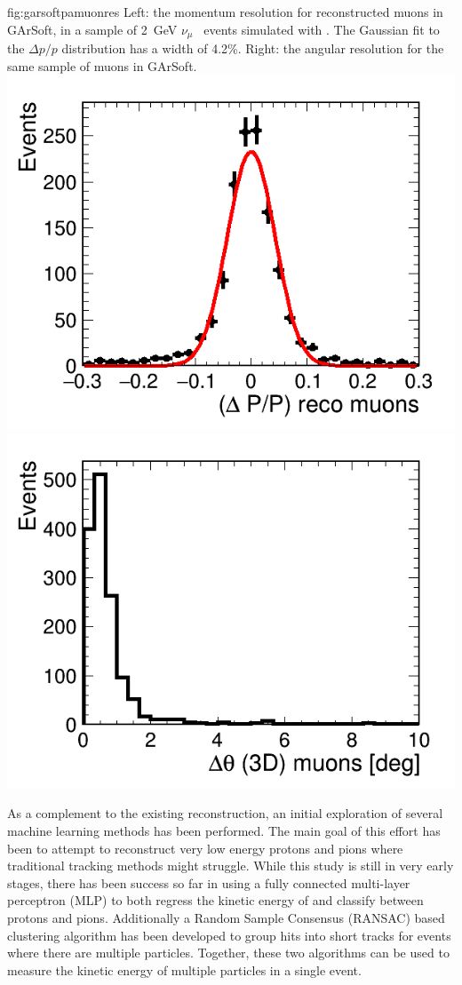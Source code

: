 \begin{dunefigure}{fig:garsoftpamuonres}
{Left: the momentum resolution for reconstructed muons in GArSoft, in a sample of \SI{2}{GeV} $\nu_\mu$~ events simulated with .  The Gaussian fit to the $\Delta p/p$ distribution has a width of 4.2\%. Right:  the \threed angular resolution for the same sample of muons in GArSoft.}
\includegraphics[width=0.49\columnwidth]{graphics/dpmuon.png}\includegraphics[width=0.49\columnwidth]{graphics/anglediffmuon.png} 
\end{dunefigure}

\label{sec:TPC_ML}                                                     

As a complement to the existing reconstruction, an initial exploration of several machine learning methods has been performed.
The main goal of this effort has been to attempt to reconstruct very low energy protons and pions where traditional           
tracking methods might struggle.   
While this study is still in very early stages, there has been success so far in using a fully connected multi-layer perceptron (MLP) to both regress
the kinetic energy of and classify between protons and pions.  Additionally a Random Sample Consensus (RANSAC) based          
clustering algorithm has been developed to group hits into short tracks for events where there are multiple particles.        
Together, these two algorithms can be used to measure the kinetic energy of multiple particles in a single event.             

